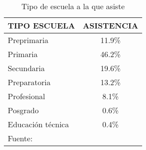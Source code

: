 \begin{table}[h]
    \centering
    \caption{Tipo de escuela a la que asiste}
    \label{tbl:EIGHG:tipo-escuela}
    \begin{tabular}{l|c}
        \multicolumn{1}{c|}{TIPO ESCUELA} & ASISTENCIA \\
        \hline
        \hline
        Preprimaria       & 11.9\%     \\
        Primaria          & 46.2\%     \\
        Secundaria        & 19.6\%     \\
        Preparatoria      & 13.2\%     \\
        Profesional       &  8.1\%     \\
        Posgrado          &  0.6\%     \\
        Educación técnica &  0.4\%     \\
        \hline
        \multicolumn{2}{l}{Fuente: \citep{INEGI-2009-DGES-003}}
    \end{tabular}
\end{table}

